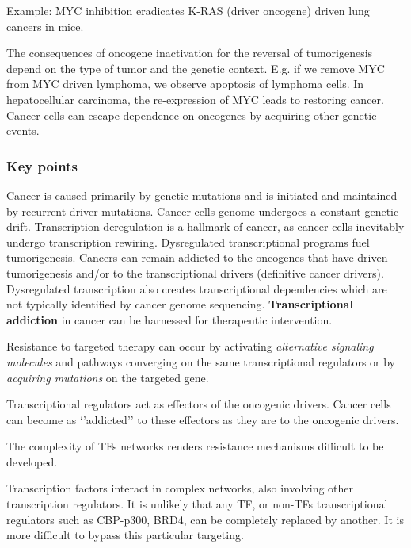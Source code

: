 Example: MYC inhibition eradicates K-RAS (driver oncogene) driven lung cancers in mice.

The consequences of oncogene inactivation for the reversal of tumorigenesis depend on the type of tumor and the genetic context. E.g. if we remove MYC from MYC driven lymphoma, we observe apoptosis of lymphoma cells. In hepatocellular carcinoma, the re-expression of MYC leads to restoring cancer. Cancer cells can escape dependence on oncogenes by acquiring other genetic events.

\hypertarget{key-points}{%
\subsubsection{Key points}\label{key-points}}

Cancer is caused primarily by genetic mutations and is initiated and maintained by recurrent driver mutations. Cancer cells genome undergoes a constant genetic drift. Transcription deregulation is a hallmark of cancer, as cancer cells inevitably undergo transcription rewiring. Dysregulated transcriptional programs fuel tumorigenesis. Cancers can remain addicted to the oncogenes that have driven tumorigenesis and/or to the transcriptional drivers (definitive cancer drivers). Dysregulated transcription also creates transcriptional dependencies which are not typically identified by cancer genome sequencing. \textbf{Transcriptional addiction} in cancer can be harnessed for therapeutic intervention.

Resistance to targeted therapy can occur by activating \emph{alternative signaling molecules} and pathways converging on the same transcriptional regulators or by \emph{acquiring mutations} on the targeted gene.

Transcriptional regulators act as effectors of the oncogenic drivers. Cancer cells can become as `'addicted'' to these effectors as they are to the oncogenic drivers.

The complexity of TFs networks renders resistance mechanisms difficult to be developed.

Transcription factors interact in complex networks, also involving other transcription regulators. It is unlikely that any TF, or non-TFs transcriptional regulators such as CBP-p300, BRD4, can be completely replaced by another. It is more difficult to bypass this particular targeting.

